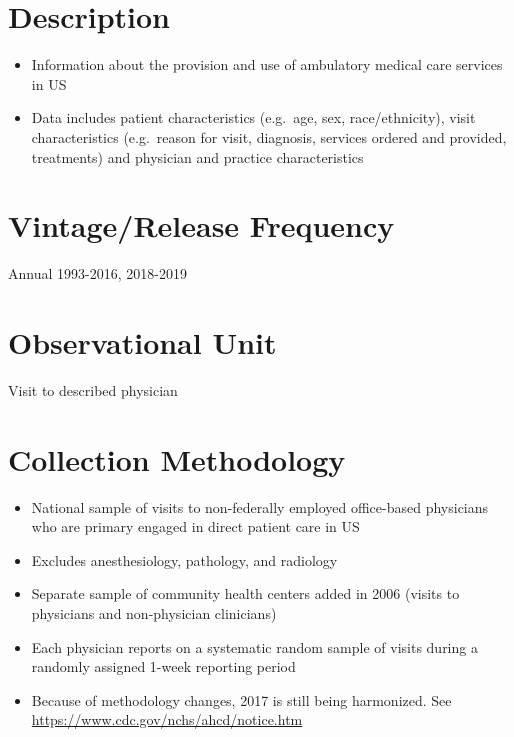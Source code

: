 \documentclass[
]{book}
\providecommand{\tightlist}{%
  \setlength{\itemsep}{0pt}\setlength{\parskip}{0pt}}
\begin{document}
\hypertarget{description-43}{%
\section{Description}\label{description-43}}

\begin{itemize}
\tightlist
\item
  Information about the provision and use of ambulatory medical care services in US
\item
  Data includes patient characteristics (e.g.~age, sex, race/ethnicity), visit characteristics (e.g.~reason for visit, diagnosis, services ordered and provided, treatments) and physician and practice characteristics
\end{itemize}

\hypertarget{vintagerelease-frequency-43}{%
\section{Vintage/Release Frequency}\label{vintagerelease-frequency-43}}

Annual 1993-2016, 2018-2019

\hypertarget{observational-unit-43}{%
\section{Observational Unit}\label{observational-unit-43}}

Visit to described physician

\hypertarget{collection-methodology-43}{%
\section{Collection Methodology}\label{collection-methodology-43}}

\begin{itemize}
\tightlist
\item
  National sample of visits to non-federally employed office-based physicians who are primary engaged in direct patient care in US
\item
  Excludes anesthesiology, pathology, and radiology
\item
  Separate sample of community health centers added in 2006 (visits to physicians and non-physician clinicians)
\item
  Each physician reports on a systematic random sample of visits during a randomly assigned 1-week reporting period
\item
  Because of methodology changes, 2017 is still being harmonized. See \url{https://www.cdc.gov/nchs/ahcd/notice.htm}
\end{itemize}
\end{document}
